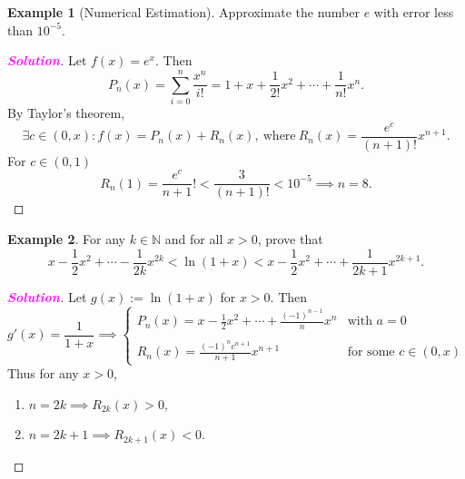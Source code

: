 \documentclass[12pt,openany]{book}
\theoremstyle{definition}
\newtheorem{example}{Example}[chapter]
\newcommand{\N}{\mathbb{N}}
\newcommand{\sol}{\textcolor{magenta}{\bf Solution}}
\begin{document}
	\vspace{10pt}
	\begin{example}[Numerical Estimation]
		Approximate the number $e$ with error less than $10^{-5}$.
		\begin{proof}[\sol]
			Let $f(x)=e^x$. Then \[
			P_n(x)=\sum_{i=0}^n\frac{x^n}{i!}=1+x+\frac{1}{2!}x^2+\cdots+\frac{1}{n!}x^n.
			\] By Taylor's theorem, \[
			\exists c\in(0,x): f(x)=P_n(x)+R_n(x),\ \text{where}\ R_n(x)=\frac{e^c}{(n+1)!}x^{n+1}.
			\] For $c\in(0,1)$ \[
			R_n(1)=\frac{e^c}{n+1}!<\frac{3}{(n+1)!}<10^{-5}\implies n = 8.
			\]
		\end{proof}
	\end{example}
	\vspace{10pt}
	\begin{example}
		For any $k\in\N$ and for all $x>0$, prove that \[
		x-\frac{1}{2}x^2+\cdots-\frac{1}{2k}x^{2k}<\ln(1+x)<x-\frac{1}{2}x^2+\cdots+\frac{1}{2k+1}x^{2k+1}.
		\]
		\begin{proof}[\sol]
			Let $g(x):=\ln(1+x)$ for $x>0$. Then \[
			g'(x)=\frac{1}{1+x}\implies \begin{cases}
				\displaystyle P_n(x)=x-\frac{1}{2}x^2+\cdots+\frac{(-1)^{n-1}}{n}x^n&\text{with $a=0$}\\
				\\
				\displaystyle R_n(x)=\frac{(-1)^nc^{n+1}}{n+1}x^{n+1}&\text{for some $c\in(0,x)$}
			\end{cases}
			\] Thus for any $x>0$, \begin{enumerate}[(1)]
				\item $n=2k\implies R_{2k}(x)>0$,
				\item $n=2k+1\implies R_{2k+1}(x)<0$.
			\end{enumerate}
		\end{proof}
	\end{example}
	
	\newpage
\end{document}
